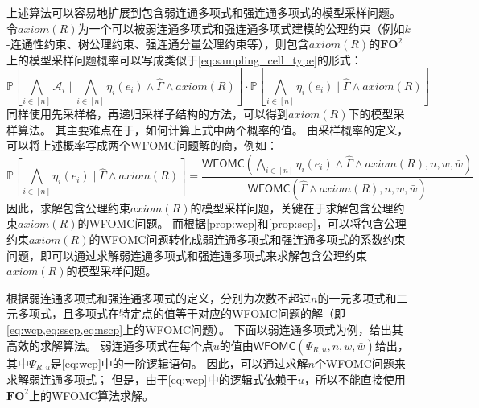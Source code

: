 \documentclass[12pt,UTF8,AutoFakeBold=3,a4paper]{ctexart} %
\newcommand{\sentence}{\Gamma}
\newcommand{\generalsentence}{{\widehat{\sentence}}}
\newcommand{\weight}{w}
\newcommand{\negweight}{\bar{w}}
\newcommand{\wfomc}{WFOMC}
\newcommand{\symwfomc}{\ensuremath{\mathsf{WFOMC}}}
\newcommand{\fotwo}{\ensuremath{\mathbf{FO}^2}}
\newcommand{\domain}{\Delta}
\newcommand{\pro}{\mathbb{P}}
\newcommand{\structure}{\mathcal{A}}
\begin{document}

上述算法可以容易地扩展到包含弱连通多项式和强连通多项式的模型采样问题。
令$axiom(R)$为一个可以被弱连通多项式和强连通多项式建模的公理约束（例如$k$-连通性约束、树公理约束、强连通分量公理约束等），则包含$axiom(R)$的\fotwo{}上的模型采样问题概率可以写成类似于\cref{eq:sampling_cell_type}的形式：
\begin{equation*}
     \pro\left[\bigwedge_{i\in[n]}\structure_i\mid \bigwedge_{i\in[n]}\eta_i(e_i)\land \generalsentence\land axiom(R) \right]\cdot \pro\left[\bigwedge_{i\in[n]}\eta_i(e_i)\mid \generalsentence\land axiom(R) \right]
\end{equation*}
同样使用先采样格，再递归采样子结构的方法，可以得到$axiom(R)$下的模型采样算法。
其主要难点在于，如何计算上式中两个概率的值。
由采样概率的定义，可以将上述概率写成两个\wfomc{}问题解的商，例如：
\begin{equation*}
     \pro\left[\bigwedge_{i\in[n]}\eta_{i}(e_i)\mid \generalsentence\land axiom(R) \right] = \frac{\symwfomc(\bigwedge_{i\in[n]}\eta_{i}(e_i)\land \generalsentence\land axiom(R), n, \weight, \negweight)}{\symwfomc(\generalsentence\land axiom(R), n, \weight, \negweight)}
\end{equation*}
因此，求解包含公理约束$axiom(R)$的模型采样问题，关键在于求解包含公理约束$axiom(R)$的\wfomc{}问题。
而根据\cref{prop:wcp}和\cref{prop:scp}，可以将包含公理约束$axiom(R)$的\wfomc{}问题转化成弱连通多项式和强连通多项式的系数约束问题，即可以通过求解弱连通多项式和强连通多项式来求解包含公理约束$axiom(R)$的模型采样问题。

根据弱连通多项式和强连通多项式的定义，分别为次数不超过$n$的一元多项式和二元多项式，且多项式在特定点的值等于对应的\wfomc{}问题的解（即\cref{eq:wcp,eq:sscp,eq:nscp}上的\wfomc{}问题）。
下面以弱连通多项式为例，给出其高效的求解算法。
弱连通多项式在每个点$u$的值由$\symwfomc(\Psi_{R,u}, n, \weight, \negweight)$给出，其中$\Psi_{R,u}$是\cref{eq:wcp}中的一阶逻辑语句。
因此，可以通过求解$n$个\wfomc{}问题来求解弱连通多项式；
但是，由于\cref{eq:wcp}中的逻辑式依赖于$u$，所以不能直接使用\fotwo{}上的\wfomc{}算法求解。
\end{document}

